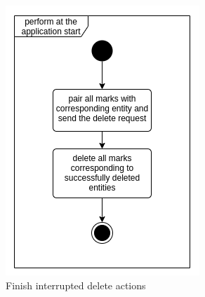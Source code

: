 \begin{figure}
\begin{minipage}[b]{0.45\textwidth}
    	\includegraphics[width=\textwidth]{pics/undo/db_clean.png}
    	\caption[Finish interrupted delete actions]{Finish interrupted delete actions}\label{fig:undoDbClean}
    \end{minipage}
    \begin{minipage}[b]{0.45\textwidth}

\end{minipage}
\end{figure}
